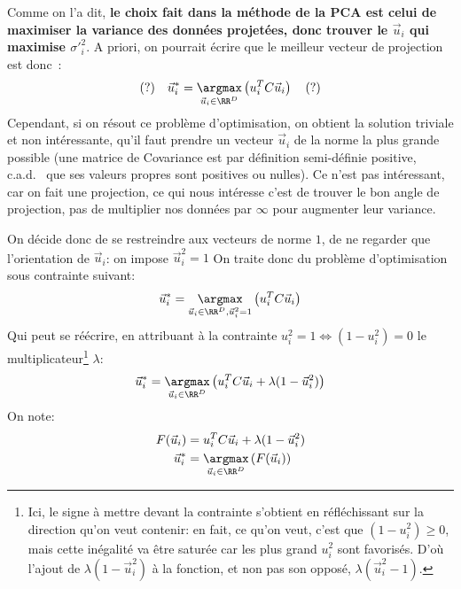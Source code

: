 \documentclass[french,twoside]{article}
\newcommand{\cad}{\text{c'est-à-dire} }
\begin{document}
Comme on l'a dit, \textbf{le choix fait dans la méthode de la PCA est celui de maximiser la variance des données projetées, donc trouver le $\vec u_i$ qui maximise $\sigma'^2_i $}. A priori, on pourrait écrire que le meilleur vecteur de projection est donc~:
\begin{align}
 (?) \quad \vec u_i ^* =  \underset{\vec u_i \in \RR^D}{\argmax}  \left( u_i^T C \vec u_i \right) \quad (?)
\end{align}
Cependant, si on résout ce problème d'optimisation, on obtient la solution triviale et non intéressante, qu'il faut prendre un vecteur $\vec u_i$ de la norme la plus grande possible (une matrice de Covariance est par définition semi-définie positive, c.a.d.~ que ses valeurs propres sont positives ou nulles).
Ce n'est pas intéressant, car on fait une projection, ce qui nous intéresse c'est de trouver le bon angle de projection, pas de multiplier nos données par $\infty$ pour augmenter leur variance.

On décide donc de se restreindre aux vecteurs de norme $1$, \cad de ne regarder que l'orientation de $\vec u_i$: on impose $\vec u_i^2=1$
On traite donc du problème d'optimisation sous contrainte suivant:
\begin{align}
\vec u_i ^* = \underset{\vec u_i \in \RR^D, \vec u_i ^2=1}{\argmax}  \left( u_i^T C \vec u_i  \right) 
\end{align}
Qui peut se réécrire, en attribuant à la contrainte $ u_i ^2=1 \Leftrightarrow  (1-u_i ^2)=0$ le multiplicateur\footnote{
Ici, le signe à mettre devant la contrainte s'obtient en réfléchissant sur la direction qu'on veut contenir: en fait, ce qu'on veut, c'est que $(1-u_i ^2) \geq 0$, mais cette inégalité va être saturée car les plus grand $u_i^2$ sont favorisés. D'où l'ajout de $\lambda (1-\vec u_i^2) $ à la fonction, et non pas son opposé, $\lambda (\vec u_i^2-1)$.
} $\lambda$:
\begin{align}
\vec u_i ^* = \underset{\vec u_i \in \RR^D}{\argmax}  \left( u_i^T C \vec u_i + \lambda (1-\vec u_i^2) \right) 
\end{align}
On note:
\begin{align}
F(\vec u_i) &= u_i^T C \vec u_i + \lambda (1-\vec u_i^2) 
\\
\vec u_i ^* &= \underset{\vec u_i \in \RR^D}{\argmax}  \left( F(\vec u_i)\right) 
\end{align}
\end{document}
